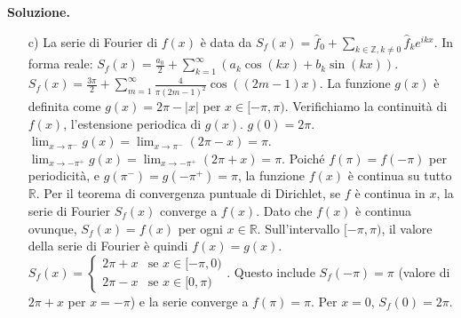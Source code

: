 \documentclass[12pt, a4paper]{article}
\newenvironment{solution}{%
    \par\noindent\textbf{Soluzione.}\medskip\par
    \normalfont
}{\par\bigskip}
\begin{document}
\begin{solution}
\begin{enumerate}
    \item[c)] La serie di Fourier di $f(x)$ è data da $S_f(x) = \hat{f}_0 + \sum_{k \in \mathbb{Z}, k \ne 0} \hat{f}_k e^{ikx}$.
    In forma reale: $S_f(x) = \frac{a_0}{2} + \sum_{k=1}^{\infty} (a_k \cos(kx) + b_k \sin(kx))$.
    $S_f(x) = \frac{3\pi}{2} + \sum_{m=1}^{\infty} \frac{4}{\pi (2m-1)^2} \cos((2m-1)x)$.
    La funzione $g(x)$ è definita come $g(x) = 2\pi - |x|$ per $x \in [-\pi, \pi)$.
    Verifichiamo la continuità di $f(x)$, l'estensione periodica di $g(x)$.
    $g(0) = 2\pi$.
    $\lim_{x \to \pi^-} g(x) = \lim_{x \to \pi^-} (2\pi-x) = \pi$.
    $\lim_{x \to -\pi^+} g(x) = \lim_{x \to -\pi^+} (2\pi+x) = \pi$.
    Poiché $f(\pi) = f(-\pi)$ per periodicità, e $g(\pi^-) = g(-\pi^+) = \pi$, la funzione $f(x)$ è continua su tutto $\mathbb{R}$.
    Per il teorema di convergenza puntuale di Dirichlet, se $f$ è continua in $x$, la serie di Fourier $S_f(x)$ converge a $f(x)$.
    Dato che $f(x)$ è continua ovunque, $S_f(x) = f(x)$ per ogni $x \in \mathbb{R}$.
    Sull'intervallo $[-\pi, \pi)$, il valore della serie di Fourier è quindi $f(x) = g(x)$.
    $S_f(x) = \begin{cases} 2\pi+x & \text{se } x \in [-\pi,0) \\ 2\pi-x & \text{se } x \in [0,\pi) \end{cases}$.
    Questo include $S_f(-\pi) = \pi$ (valore di $2\pi+x$ per $x=-\pi$) e la serie converge a $f(\pi) = \pi$. Per $x=0$, $S_f(0)=2\pi$.
\end{enumerate}
\end{solution}
\end{document}
